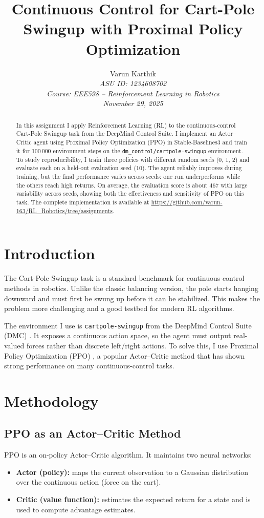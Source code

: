 \documentclass[a4paper, twocolumn, 10pt]{article}
\title{\textbf{Continuous Control for Cart-Pole Swingup with Proximal Policy Optimization}}
\author{
    Varun Karthik \\
    \textit{ASU ID: 1234608702} \\[0.5em]
    \textit{Course: EEE598 -- Reinforcement Learning in Robotics} \\
    \textit{November 29, 2025}
}
\date{}
\begin{document}
\maketitle

\begin{abstract}
In this assignment I apply Reinforcement Learning (RL) to the continuous-control Cart-Pole Swingup task from the DeepMind Control Suite. I implement an Actor--Critic agent using Proximal Policy Optimization (PPO) in Stable-Baselines3 and train it for 100\,000 environment steps on the \texttt{dm\_control/cartpole-swingup} environment. To study reproducibility, I train three policies with different random seeds (0, 1, 2) and evaluate each on a held-out evaluation seed (10). The agent reliably improves during training, but the final performance varies across seeds: one run underperforms while the others reach high returns. On average, the evaluation score is about 467 with large variability across seeds, showing both the effectiveness and sensitivity of PPO on this task. The complete implementation is available at \url{https://github.com/varun-163/RL_Robotics/tree/assignments}.
\end{abstract}

\section{Introduction}
The Cart-Pole Swingup task is a standard benchmark for continuous-control methods in robotics. Unlike the classic balancing version, the pole starts hanging downward and must first be swung up before it can be stabilized. This makes the problem more challenging and a good testbed for modern RL algorithms.

The environment I use is \texttt{cartpole-swingup} from the DeepMind Control Suite (DMC) \cite{tassa2018deepmind}. It exposes a continuous action space, so the agent must output real-valued forces rather than discrete left/right actions. To solve this, I use Proximal Policy Optimization (PPO) \cite{schulman2017proximal}, a popular Actor--Critic method that has shown strong performance on many continuous-control tasks.

\section{Methodology}

\subsection{PPO as an Actor--Critic Method}
PPO is an on-policy Actor--Critic algorithm. It maintains two neural networks:
\begin{itemize}
    \item \textbf{Actor (policy):} maps the current observation to a Gaussian distribution over the continuous action (force on the cart).
    \item \textbf{Critic (value function):} estimates the expected return for a state and is used to compute advantage estimates.
\end{itemize}
\end{document}
